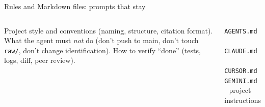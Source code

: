 

\begin{frame}{Rules and Markdown files: prompts that stay}
  \begin{columns}[T,onlytextwidth]
      \threebullets%
        {Project style and conventions (naming, structure, citation format).}%
        {What the agent must \emph{not} do (don't push to main, don't touch \texttt{raw/}, don't change identification).}%
        {How to verify ``done'' (tests, logs, diff, peer review).}
      \vspace{0.3cm}
      \begin{center}\ttfamily\small \texttt{AGENTS.md} \,\textbar\, \texttt{CLAUDE.md} \,\textbar\, \texttt{CURSOR.md}\\\texttt{GEMINI.md} \,\textbar\, project instructions\end{center}
  \end{columns}
\end{frame}

